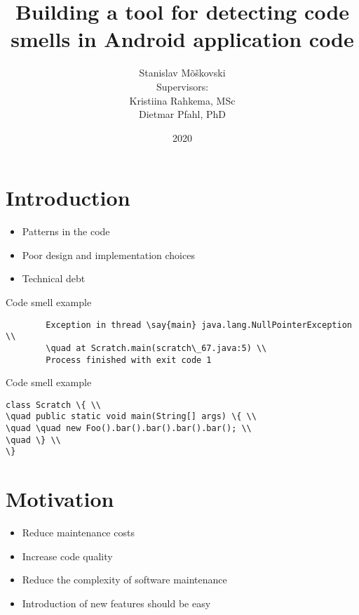 \documentclass{beamer}
\title{Building a tool for detecting code smells in Android application code}
\author[Stanislav Mõškovski]{Stanislav Mõškovski\\ {\vspace{8mm}\small Supervisors: \\ Kristiina Rahkema, MSc \\Dietmar Pfahl, PhD}}
\institute{University of Tartu}
\date{2020}
\begin{document}
    \frame{\titlepage}

    \section{Introduction}\label{sec:introduction}
    \begin{frame}{\secname}
        \begin{itemize}
            \item Patterns in the code
            \item Poor design and implementation choices
            \item Technical debt
        \end{itemize}
    \end{frame}

    \begin{frame}{Code smell example}
        \begin{verbatim}
        Exception in thread \say{main} java.lang.NullPointerException \\
        \quad at Scratch.main(scratch\_67.java:5) \\
        Process finished with exit code 1
        \end{verbatim}
    \end{frame}

    \begin{frame}{Code smell example}
        \begin{verbatim}
class Scratch \{ \\
\quad public static void main(String[] args) \{ \\
\quad \quad new Foo().bar().bar().bar().bar(); \\
\quad \} \\
\}
        \end{verbatim}
    \end{frame}

    \section{Motivation}\label{sec:motivation}
    \begin{frame}{\secname}
        \begin{itemize}
            \item Reduce maintenance costs
            \item Increase code quality
            \item Reduce the complexity of software maintenance
            \item Introduction of new features should be easy
        \end{itemize}
    \end{frame}
\end{document}
